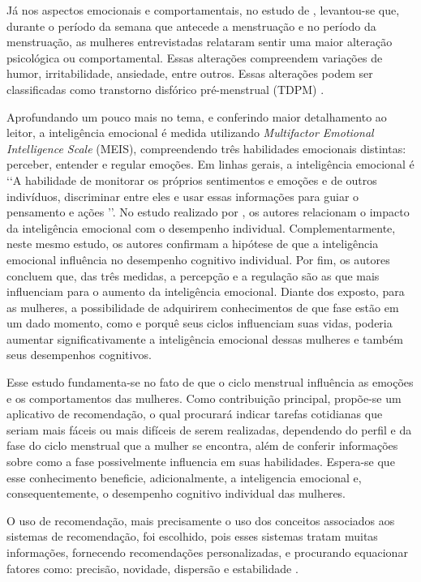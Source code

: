Já nos aspectos emocionais e comportamentais, no estudo de , levantou-se que, 
durante o período da semana que antecede a menstruação e no período da menstruação, as mulheres 
entrevistadas relataram sentir uma maior alteração psicológica ou comportamental. Essas alterações 
compreendem variações de humor, irritabilidade, ansiedade, entre outros. Essas alterações podem ser 
classificadas como transtorno disfórico pré-menstrual (TDPM) \cite{ACOG2000}.



Aprofundando um pouco mais no tema, e conferindo maior detalhamento ao leitor, a inteligência emocional 
é medida utilizando \textit{Multifactor Emotional Intelligence Scale} (MEIS), compreendendo três 
habilidades emocionais distintas: perceber, entender e regular emoções. Em linhas gerais, a inteligência 
emocional é \lq \lq A habilidade de monitorar os próprios sentimentos e emoções e de outros indivíduos, 
discriminar entre eles e usar essas informações para guiar o pensamento e ações \rq \rq \cite{salovey1990}. 
No estudo realizado por , os autores relacionam o impacto da inteligência emocional 
com o desempenho individual. Complementarmente, neste mesmo estudo, os autores confirmam a hipótese de 
que a inteligência emocional influência no desempenho cognitivo individual. Por fim, os autores concluem 
que, das três medidas, a percepção e a regulação são as que mais influenciam para o aumento da inteligência 
emocional. Diante dos exposto, para as mulheres, a possibilidade de adquirirem conhecimentos de que 
fase estão em um dado momento, como e porquê seus ciclos influenciam suas vidas, poderia aumentar 
significativamente a inteligência emocional dessas mulheres e também seus desempenhos cognitivos. 



Esse estudo fundamenta-se no fato de que o ciclo menstrual influência as emoções e os comportamentos 
das mulheres. Como contribuição principal, propõe-se um aplicativo de recomendação, o qual procurará 
indicar tarefas cotidianas que seriam mais fáceis ou mais difíceis de serem realizadas, dependendo do 
perfil e da fase do ciclo menstrual que a mulher se encontra, além de conferir informações sobre como 
a fase possivelmente influencia em suas habilidades. Espera-se que esse conhecimento beneficie, 
adicionalmente, a inteligencia emocional e, consequentemente, o desempenho cognitivo individual das 
mulheres.

O uso de recomendação, mais precisamente o uso dos conceitos associados aos sistemas de recomendação, 
foi escolhido, pois esses sistemas tratam muitas informações, fornecendo recomendações personalizadas, 
e procurando equacionar fatores como: precisão, novidade, dispersão e estabilidade \cite{bobadilla2013}.


